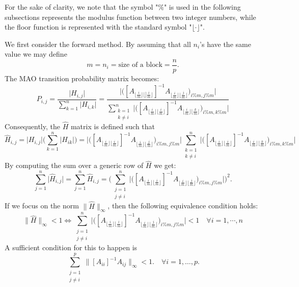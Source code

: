 For the sake of clarity, we note that the symbol "$\%$" is used in the following
subsections represents the modulus function between two integer numbers, while
the floor function is represented with the standard symbol "$\lfloor
\cdot \rfloor$".

We first consider the forward method.
By assuming that all $n_i$'s have the same value we may define
\[
 m=n_i=\text{size of a block}=\frac{n}{p}.
\]
The MAO transition probability matrix becomes:
\[
 P_{i,j}=\frac{\lvert H_{i,j} \rvert}{\sum_{k=1}^n\lvert H_{i,k}
\rvert}=\frac{\bigg \lvert \bigg ([A_{\lfloor
\frac{i}{m}\rfloor \lfloor]
\frac{i}{m}\rfloor}]^{-1} A_{\lfloor \frac{i}{m}\rfloor \lfloor
\frac{j}{m}\rfloor}\bigg )_{i\%m,j\%m}\bigg
\rvert}{\sum_{\substack{k=1\\k\ne i}}^n\bigg \lvert \bigg
([A_{\lfloor
\frac{i}{m}\rfloor \lfloor
\frac{i}{m}\rfloor}]^{-1} A_{\lfloor \frac{i}{m}\rfloor \lfloor
\frac{k}{m}\rfloor}\bigg )_{i\%m,k\%m}\bigg \rvert}
\]
Consequently, the $\hat{H}$ matrix is defined such that
\[
\hat{H}_{i,j} = \lvert H_{i,j}\rvert\bigg(\sum_{k=1}^n\lvert H_{ik}\rvert\bigg)=
\bigg \lvert \bigg ([A_{\lfloor \frac{i}{m}\rfloor \lfloor
\frac{i}{m}\rfloor}]^{-1} A_{\lfloor \frac{i}{m}\rfloor \lfloor
\frac{j}{m}\rfloor}\bigg )_{i\%m,j\%m}\bigg
\rvert
\sum_{\substack{k=1\\k\ne i}}^n\bigg \lvert \bigg ([A_{\lfloor
\frac{i}{m}\rfloor \lfloor
\frac{i}{m}\rfloor}]^{-1} A_{\lfloor \frac{i}{m}\rfloor \lfloor
\frac{k}{m}\rfloor}\bigg )_{i\%m,k\%m}\bigg \rvert
\]
By computing the sum over a generic row of $\hat{H}$ we get:
\[
 \sum_{j=1}^n \lvert \hat{H}_{i,j}\rvert=\sum_{j=1}^n \hat{H}_{i,j} =
 \bigg ( \sum_{\substack{j=1\\j\ne i}}^n\bigg \lvert \bigg ([A_{\lfloor
\frac{i}{m}\rfloor \lfloor
\frac{i}{m}\rfloor}]^{-1} A_{\lfloor \frac{i}{m}\rfloor \lfloor
\frac{j}{m}\rfloor}\bigg )_{i\%m,j\%m}\bigg \rvert \bigg ) ^2.
\]
If we focus on the norm $\lVert \hat{H}\rVert_{\infty}$, then the following
equivalence condition holds:
\[
 \lVert \hat{H}\rVert_{\infty}<1 \Leftrightarrow \sum_{\substack{j=1\\j\ne
i}}^n\bigg \lvert \bigg ([A_{\lfloor
\frac{i}{m}\rfloor \lfloor
\frac{i}{m}\rfloor}]^{-1} A_{\lfloor \frac{i}{m}\rfloor \lfloor
\frac{j}{m}\rfloor}\bigg )_{i\%m,j\%m}\bigg \rvert <1 \quad \forall
i=1,\cdots,n
\]
 A sufficient condition for this to happen is
 \begin{equation}
  \sum_{\substack{j=1\\j\ne i}}^p \lVert [A_{ii}]^{-1}A_{ij}\rVert_{\infty}<1.
    \label{block_cs}\quad \forall i=1,\ldots,p.
 \end{equation}
